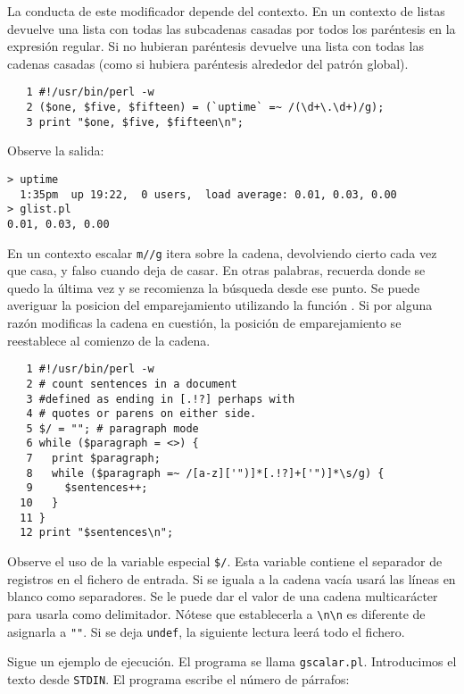 \label{section:g}
La conducta de este modificador depende del contexto. En un contexto de
listas devuelve una lista con todas las subcadenas casadas
por todos los paréntesis en la expresión regular. Si no hubieran 
paréntesis devuelve una lista con todas las cadenas casadas
(como si hubiera paréntesis alrededor del patrón global).

\begin{verbatim}
   1 #!/usr/bin/perl -w
   2 ($one, $five, $fifteen) = (`uptime` =~ /(\d+\.\d+)/g);
   3 print "$one, $five, $fifteen\n";
\end{verbatim}

Observe la salida:
\begin{verbatim}
> uptime
  1:35pm  up 19:22,  0 users,  load average: 0.01, 0.03, 0.00
> glist.pl
0.01, 0.03, 0.00 
\end{verbatim}

En un contexto escalar \verb|m//g| itera sobre la cadena, devolviendo
cierto cada vez que casa, y falso cuando deja de casar. En otras 
palabras, recuerda donde se quedo la última vez y se recomienza la búsqueda
desde ese punto. Se puede averiguar la posicion del emparejamiento
utilizando la función . 
Si por alguna razón modificas la cadena en cuestión, 
la posición de emparejamiento se reestablece al comienzo de la cadena.
\begin{verbatim}
   1 #!/usr/bin/perl -w
   2 # count sentences in a document
   3 #defined as ending in [.!?] perhaps with
   4 # quotes or parens on either side.
   5 $/ = ""; # paragraph mode
   6 while ($paragraph = <>) {
   7   print $paragraph;
   8   while ($paragraph =~ /[a-z]['")]*[.!?]+['")]*\s/g) {
   9     $sentences++;
  10   }
  11 }
  12 print "$sentences\n";
\end{verbatim}

Observe el uso de la variable especial \verb|$/|. 
Esta variable contiene el separador de registros en el fichero de 
entrada. Si se iguala a la cadena vacía usará las líneas 
en blanco como separadores. Se le puede dar el valor de una cadena multicarácter
para usarla como delimitador. Nótese que establecerla a \verb|\n\n|
es diferente de asignarla a \verb|""|. Si se deja \verb|undef|, 
la siguiente lectura leerá todo el fichero.

Sigue un ejemplo de ejecución. El programa se llama \verb|gscalar.pl|.
Introducimos el texto desde \verb|STDIN|. El programa escribe el
número de párrafos:

